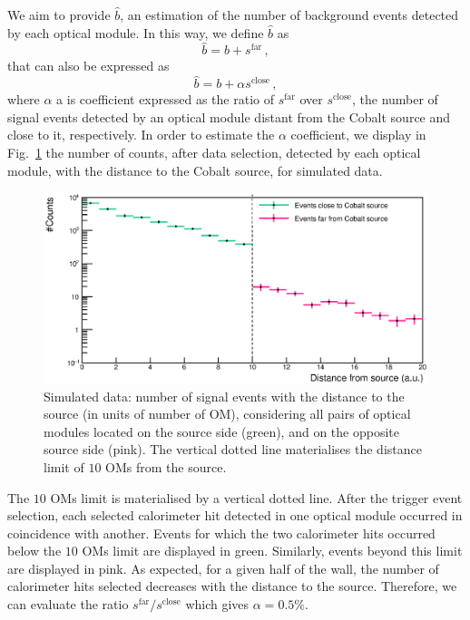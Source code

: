 We aim to provide $\hat{b}$, an estimation of the number of background events detected by each optical module.
In this way, we define $\hat{b}$ as
\begin{equation}
  \hat{b} = b + s^{\text{far}}\,,
\end{equation}
that can also be expressed as
\begin{equation}
  \hat{b} = b + \alpha s^{\text{close}}\,,
  \label{eq:estimation_bdf}
\end{equation}
where $\alpha$ a is coefficient expressed as the ratio of $s^{\text{far}}$ over $s^{\text{close}}$, the number of signal events detected by an optical module distant from the Cobalt source and close to it, respectively.
In order to estimate the $\alpha$ coefficient, we display in Fig.~\ref{fig:Co_simus_bkg} the number of counts, after data selection, detected by each optical module, with the distance to the Cobalt source, for simulated data.
\begin{figure}[h]
  \centering
  \includegraphics[width=17cm]{commissioning/fig_commissioning/Co_simus_bkg.eps}
  \caption{Simulated data: number of signal events with the distance to the source (in units of number of OM), considering all pairs of optical modules located on the source side (green), and on the opposite source side (pink).
    The vertical dotted line materialises the distance limit of $10$ OMs from the source.
    \label{fig:Co_simus_bkg}}
\end{figure}
The $10$ OMs limit is materialised by a vertical dotted line.
After the trigger event selection, each selected calorimeter hit detected in one optical module occurred in coincidence with another.
Events for which the two calorimeter hits occurred below the $10$ OMs limit are displayed in green.
Similarly, events beyond this limit are displayed in pink.
As expected, for a given half of the wall, the number of calorimeter hits selected decreases with the distance to the source.
Therefore, we can evaluate the ratio $s^{\text{far}}/s^{\text{close}}$ which gives $\alpha = 0.5\%$.

